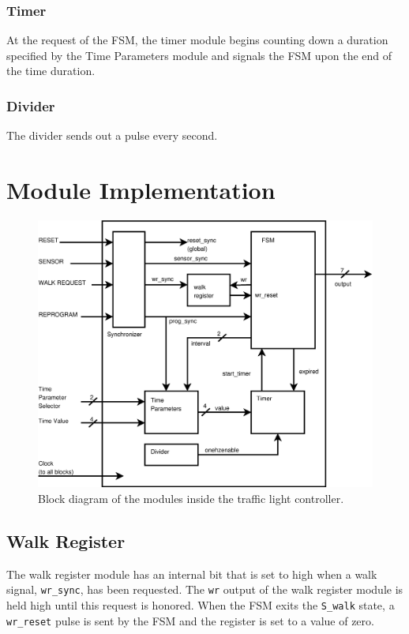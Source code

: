 \documentclass[11]{article}
\begin{document}
		\subsubsection{Timer}
		At the request of the FSM, the timer module begins counting down a
		duration specified by the Time Parameters module and signals the
		FSM upon the end of the time duration.

		\subsubsection{Divider}
		The divider sends out a pulse every second.

\section{Module Implementation}
	\begin{figure}[h]
	\centering
	\includegraphics[scale=0.4]{block.ps}
	\caption{Block diagram of the modules inside the traffic light controller.}
	\label{fig:block}
	\end{figure}
	\subsection{Walk Register}
	The walk register module has an internal bit that is set to high when a
	walk signal, \texttt{wr\_sync}, has been requested.  The \texttt{wr}
	output of the walk register module is held high until this request is
	honored.  When the FSM exits the \texttt{S\_walk} state, a
	\texttt{wr\_reset} pulse is sent by the FSM and the register is set to
	a value of zero.
\end{document}
